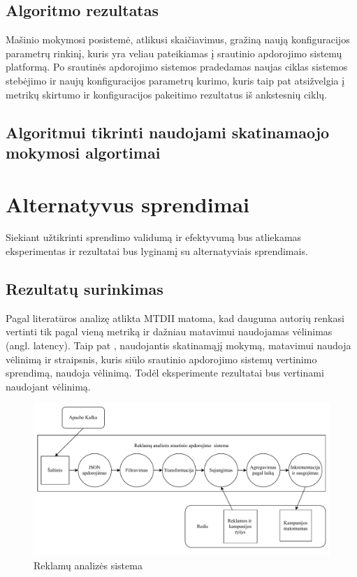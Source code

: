 \documentclass{VUMIFPSbakalaurinis}
\begin{document}
\subsection{Algoritmo rezultatas}
Mašinio mokymosi posistemė, atlikusi skaičiavimus, gražiną naują konfiguracijos parametrų rinkinį, kuris yra veliau pateikiamas į srautinio apdorojimo sistemų platformą. Po srautinės apdorojimo sistemos pradedamas naujas ciklas sistemos stebėjimo ir naujų konfiguracijos parametrų kurimo, kuris taip pat atsižvelgia į metrikų skirtumo ir konfiguracijos pakeitimo rezultatus iš  ankstesnių ciklų.

\subsection{Algoritmui tikrinti naudojami skatinamaojo mokymosi algortimai}

\section{Alternatyvus sprendimai}
Siekiant užtikrinti sprendimo validumą ir efektyvumą bus atliekamas eksperimentas ir rezultatai bus lyginamį su alternatyviais sprendimais.

\subsection{Rezultatų surinkimas}

Pagal literatūros analizę atlikta MTDII matoma, kad dauguma autorių renkasi vertinti tik pagal vieną metriką ir dažniau matavimui naudojamas vėlinimas (angl. latency). Taip pat \cite{vaquero2018autotuning}, naudojantis skatinamąjį mokymą, matavimui naudoja vėlinimą ir \cite{Chintapalli2016Benchmarking} straipsnis, kuris siūlo srautinio apdorojimo sistemų vertinimo sprendimą, naudoja vėlinimą. Todėl eksperimente rezultatai bus vertinami naudojant vėlinimą.   

\begin{figure}[H]
    \includegraphics[width=15cm]{img/yahoo.pdf}
    \caption{Reklamų analizės sistema \cite{Chintapalli2016Benchmarking}}
    \label{yahoo}
\end{figure} 
\end{document}
